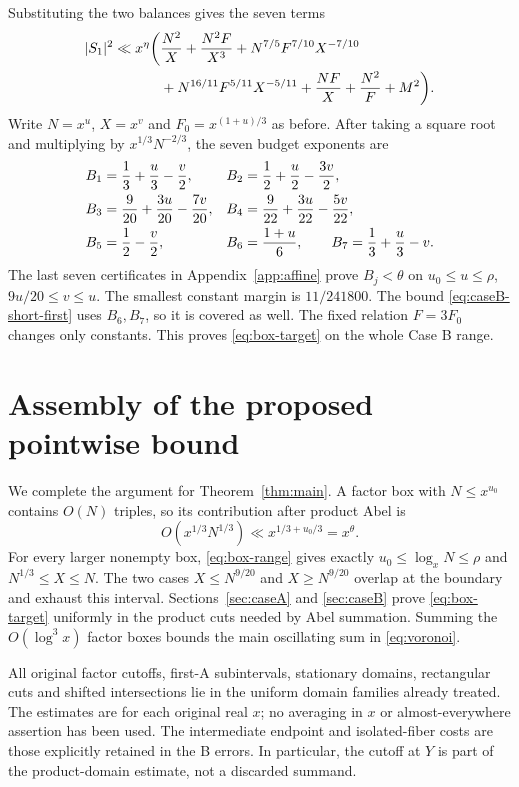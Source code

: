 \documentclass[11pt,a4paper]{article}
\numberwithin{equation}{section}
\theoremstyle{remark}
\newcommand{\Fzero}{F_0}
\begin{document}
Substituting the two balances gives the seven terms
\begin{align}\label{eq:Bfinal}
 |S_1|^2\ll x^\eta\biggl(&\frac{N^2}{X}+\frac{N^2F}{X^3}
       +N^{7/5}F^{7/10}X^{-7/10}\notag\\
       &+N^{16/11}F^{5/11}X^{-5/11}
       +\frac{NF}{X}+\frac{N^2}{F}+M^2\biggr).
\end{align}
Write $N=x^u$, $X=x^v$ and $\Fzero=x^{(1+u)/3}$ as before. After taking
a square root and multiplying by $x^{1/3}N^{-2/3}$, the seven budget
exponents are
\begin{align}
 B_1&=\frac13+\frac u3-\frac v2,
 & B_2&=\frac12+\frac u2-\frac{3v}{2},\notag\\
 B_3&=\frac9{20}+\frac{3u}{20}-\frac{7v}{20},
 & B_4&=\frac9{22}+\frac{3u}{22}-\frac{5v}{22},
                 \label{eq:Bexponents}\\
 B_5&=\frac12-\frac v2,
 & B_6&=\frac{1+u}{6},\qquad
 B_7=\frac13+\frac u3-v.\notag
\end{align}
The last seven certificates in Appendix~\ref{app:affine} prove
$B_j<\theta$ on $u_0\le u\le\rho$, $9u/20\le v\le u$.
The smallest constant margin is $11/241800$. The bound
\eqref{eq:caseB-short-first} uses $B_6,B_7$, so it is covered as well.
The fixed relation $F=3\Fzero$ changes only constants. This proves
\eqref{eq:box-target} on the whole Case B range.

\section{Assembly of the proposed pointwise bound}
\label{sec:assembly}
We complete the argument for Theorem~\ref{thm:main}. A factor box with
$N\le x^{u_0}$ contains $O(N)$ triples, so its contribution after product
Abel is
\[
 O(x^{1/3}N^{1/3})\ll x^{1/3+u_0/3}=x^\theta.
\]
For every larger nonempty box, \eqref{eq:box-range} gives exactly
$u_0\le\log_xN\le\rho$ and $N^{1/3}\le X\le N$. The two cases
$X\le N^{9/20}$ and $X\ge N^{9/20}$ overlap at the boundary and exhaust
this interval. Sections~\ref{sec:caseA} and \ref{sec:caseB} prove
\eqref{eq:box-target} uniformly in the product cuts needed by Abel
summation. Summing the $O(\log^3x)$ factor boxes bounds the main oscillating
sum in \eqref{eq:voronoi}.

All original factor cutoffs, first-A subintervals, stationary domains,
rectangular cuts and shifted intersections lie in the uniform domain
families already treated. The estimates are for each original real $x$;
no averaging in $x$ or almost-everywhere assertion has been used. The
intermediate endpoint and isolated-fiber costs are those explicitly
retained in the B errors. In particular, the cutoff at $Y$ is part of
the product-domain estimate, not a discarded summand.
\end{document}

